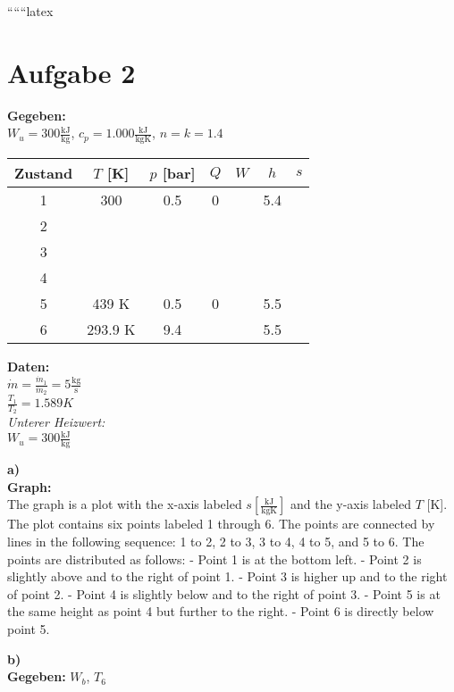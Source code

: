 
``````latex


\section*{Aufgabe 2}

\textbf{Gegeben:} \\
$W_u = 300 \frac{\text{kJ}}{\text{kg}}$, $c_p = 1.000 \frac{\text{kJ}}{\text{kgK}}$, $n = k = 1.4$

\begin{tabular}{c|c|c|c|c|c|c}
Zustand & $T$ [K] & $p$ [bar] & $Q$ & $W$ & $h$ & $s$ \\
\hline
1 & 300 & 0.5 & 0 & & 5.4 & \\
2 & & & & & & \\
3 & & & & & & \\
4 & & & & & & \\
5 & 439 K & 0.5 & 0 & & 5.5 & \\
6 & 293.9 K & 9.4 & & & 5.5 & \\
\end{tabular}

\textbf{Daten:} \\
$\dot{m} = \frac{\dot{m}_1}{\dot{m}_2} = 5 \frac{\text{kg}}{\text{s}}$ \\
$\frac{T_1}{T_2} = 1.589 K$ \\
\textit{Unterer Heizwert:} \\
$W_u = 300 \frac{\text{kJ}}{\text{kg}}$

\textbf{a)} \\
\textbf{Graph:} \\
The graph is a plot with the x-axis labeled $s \left[ \frac{\text{kJ}}{\text{kgK}} \right]$ and the y-axis labeled $T$ [K]. The plot contains six points labeled 1 through 6. The points are connected by lines in the following sequence: 1 to 2, 2 to 3, 3 to 4, 4 to 5, and 5 to 6. The points are distributed as follows:
- Point 1 is at the bottom left.
- Point 2 is slightly above and to the right of point 1.
- Point 3 is higher up and to the right of point 2.
- Point 4 is slightly below and to the right of point 3.
- Point 5 is at the same height as point 4 but further to the right.
- Point 6 is directly below point 5.

\textbf{b)} \\
\textbf{Gegeben:} $W_b$, $T_6$

